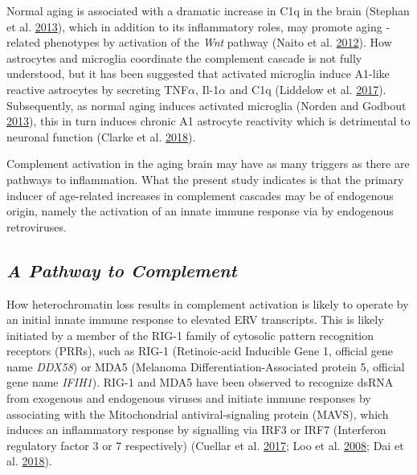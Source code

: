 \documentclass[onehalf,12pt]{beavtex}
\begin{document}
  Normal aging is associated with a dramatic increase in C1q in the brain
  (Stephan et al.
  \protect\hyperlink{ref-StephanDramaticIncreaseC1q2013}{2013}), which in
  addition to its inflammatory roles, may promote aging -related
  phenotypes by activation of the \emph{Wnt} pathway (Naito et al.
  \protect\hyperlink{ref-NaitoComplementC1qActivates2012a}{2012}). How
  astrocytes and microglia coordinate the complement cascade is not fully
  understood, but it has been suggested that activated microglia induce
  A1-like reactive astrocytes by secreting TNF\(\alpha\), Il-1\(\alpha\)
  and C1q (Liddelow et al.
  \protect\hyperlink{ref-LiddelowNeurotoxicreactiveastrocytes2017}{2017}).
  Subsequently, as normal aging induces activated microglia (Norden and
  Godbout \protect\hyperlink{ref-NordenMicrogliaagedbrain2013}{2013}),
  this in turn induces chronic A1 astrocyte reactivity which is
  detrimental to neuronal function (Clarke et al.
  \protect\hyperlink{ref-ClarkeNormalaginginduces2018}{2018}).
  
  Complement activation in the aging brain may have as many triggers as
  there are pathways to inflammation. What the present study indicates is
  that the primary inducer of age-related increases in complement cascades
  may be of endogenous origin, namely the activation of an innate immune
  response via by endogenous retroviruses.
  
  \subsection*{\texorpdfstring{\emph{A Pathway to
  Complement}}{A Pathway to Complement}}\label{a-pathway-to-complement}
  
  How heterochromatin loss results in complement activation is likely to
  operate by an initial innate immune response to elevated ERV
  transcripts. This is likely initiated by a member of the RIG-1 family of
  cytosolic pattern recognition receptors (PRRs), such as RIG-1
  (Retinoic-acid Inducible Gene 1, official gene name \emph{DDX58}) or
  MDA5 (Melanoma Differentiation-Associated protein 5, official gene name
  \emph{IFIH1}). RIG-1 and MDA5 have been observed to recognize dsRNA from
  exogenous and endogenous viruses and initiate immune responses by
  associating with the Mitochondrial antiviral-signaling protein (MAVS),
  which induces an inflammatory response by signalling via IRF3 or IRF7
  (Interferon regulatory factor 3 or 7 respectively) (Cuellar et al.
  \protect\hyperlink{ref-CuellarSilencingretrotransposonsSETDB12017}{2017};
  Loo et al. \protect\hyperlink{ref-LooDistinctRIGIMDA52008}{2008}; Dai et
  al. \protect\hyperlink{ref-DaicytosolicdsRNAsensingpathway2018}{2018}).
  
\end{document}
